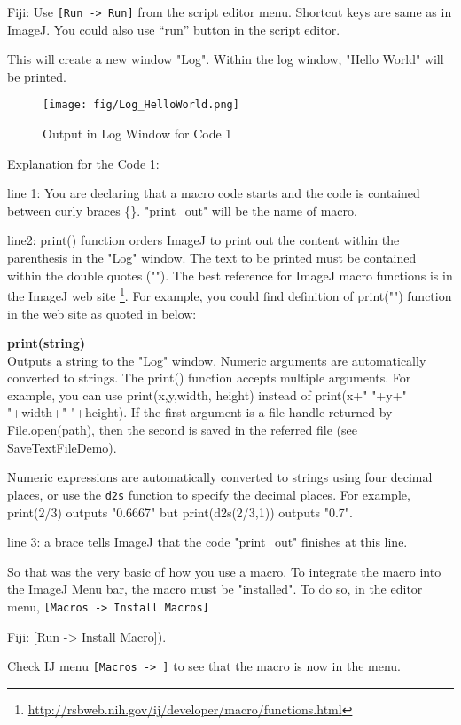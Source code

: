 \documentclass[11pt,a4paper,oneside]{report}
\newenvironment{indentFiji}%
{\begin{list}{}%
         {\setlength{\leftmargin}{1em}}%
         \item[]%
}
{\end{list}}
\newenvironment{indentCom}%
{\begin{list}{}%
         {\setlength{\leftmargin}{1em}}%
         \item[]%
}
{\end{list}}
\newcommand{\ijmenu}[1]{\texttt{\small#1}}
\newcommand{\ilcom}[1]{\texttt{\small#1}}
\begin{document}
\begin{indentFiji}
Fiji:  Use \ijmenu{[Run -> Run]} from the script editor menu. Shortcut keys are
same as in ImageJ. You could also use ``run'' button in the script editor. 
\end{indentFiji}
This will create a new window "Log". Within the log window, "Hello World" will
be printed.

\begin{figure}[htbp]
\begin{center}
\texttt{[image: fig/Log\_HelloWorld.png]}
\caption{Output in Log Window for Code 1} \label{fig23-1}
\end{center}
\end{figure}

Explanation for the Code 1:\\
\begin{itemize}
\item line 1: You are declaring that a macro code starts and the code is contained between 
curly braces \{\}. "print\_out" will be the name of macro. 

\item line2: print() function orders ImageJ to print out the content within the parenthesis 
in the "Log" window. The text to be printed must be contained within the double quotes (""). 
The best reference for ImageJ macro functions is in the ImageJ web site
\footnote{\url{http://rsbweb.nih.gov/ij/developer/macro/functions.html}}. 
For example, you could find definition of print("") function in the web site as quoted in below:\\
\begin{indentCom}
\textbf{print(string)}\\
Outputs a string to the "Log" window. Numeric arguments are automatically converted to strings. 
The print() function accepts multiple arguments. For example, you can use print(x,y,width, height) 
instead of print(x+" "+y+" "+width+" "+height). 
If the first argument is a file handle returned by File.open(path), 
then the second is saved in the referred file (see SaveTextFileDemo).

Numeric expressions are automatically converted to strings using four decimal places, 
or use the \ilcom{d2s} function to specify the decimal places. 
For example, print(2/3) outputs "0.6667" but print(d2s(2/3,1)) outputs "0.7".
\end{indentCom}

\item line 3: a brace tells ImageJ that the code "print\_out" finishes at this line.  
\end{itemize}
So that was the very basic of how you use a macro. To integrate the macro into the ImageJ Menu bar, 
the macro must be "installed". To do so, in the editor menu, \ijmenu{[Macros -> Install Macros]} 
\begin{indentFiji}
Fiji: [Run -> Install Macro]).
\end{indentFiji}
Check IJ menu \ijmenu{[Macros -> ]} to see that the macro is now in the menu.\\
\end{document}
